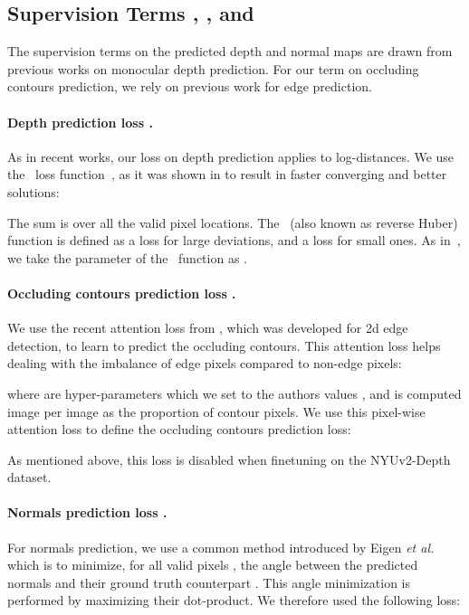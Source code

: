 \documentclass[10pt,twocolumn,letterpaper]{article}
\begin{document}
\subsection{Supervision Terms , , and 
}

The supervision  terms on  the predicted  depth and normal  maps are  drawn from
previous  works  on monocular  depth  prediction.   For  our term  on  occluding
contours prediction, we rely on previous work for edge prediction.


\paragraph{Depth prediction loss .}

As in recent  works, our loss on depth prediction  applies to log-distances.  We
use  the \BerHu~loss  function~\cite{BerHuOwen,BerHuZwald}, as  it  was
shown in \cite{Laina2016DeeperDP}  to result in faster converging
and better solutions:

The sum is  over all the   valid pixel locations.  The  \BerHu~(also known as
reverse Huber) function is  defined as a  loss for  large deviations, and a
  loss for  small ones.   As in~\cite{Laina2016DeeperDP},  we take  the 
parameter  of   the  \BerHu~function  as  .

\paragraph{Occluding contours prediction loss .}

We use the recent attention loss from \cite{DOOBNet}, which was developed for 2d
edge detection, to learn to predict the occluding contours. This attention loss
helps dealing with  the imbalance of edge pixels compared to non-edge pixels:

where  are hyper-parameters which  we set to the authors values
, and    is computed  image  per image  as  the proportion  
of contour pixels. We use this pixel-wise  attention loss to define the 
occluding contours prediction loss:

As mentioned  above, this loss  is disabled  when finetuning on  the NYUv2-Depth
dataset.


\paragraph{Normals prediction loss .}

For normals prediction, we use a common method introduced by Eigen \emph{et 
al.}~\cite{Eigen2015PredictingDS} which is to minimize, for all valid pixels 
, the angle between the predicted normals   and their ground 
truth counterpart . This angle minimization is performed by maximizing 
their dot-product. We therefore used the following loss:
\end{document}
